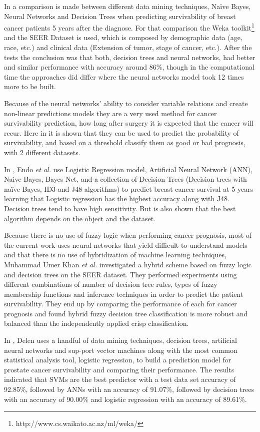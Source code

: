 In \cite{Bellaachia2006} a comparison is made between different data mining techniques, Naïve Bayes, Neural Networks and Decision Trees 
when predicting survivability of breast cancer patients 5 years after the diagnose. For that comparison the Weka toolkit\footnote{http://www.cs.waikato.ac.nz/ml/weka/} and the SEER 
Dataset is used, which is composed by demographic data (age, race, etc.) and clinical data (Extension of tumor, stage of cancer, etc.). 
After the tests the conclusion was that both, decision trees and neural networks, had better and similar performance with accuracy around 86\%, 
though in the computational time the approaches did differ where the neural networks model took 12 times more to be built.

Because of the neural networks’ ability to consider variable relations and create non-linear predictions models they are a very used 
method for cancer survivability prediction, how long after surgery it is expected that the cancer will recur. Here in \cite{Chi2007} it 
is shown that they can be used to predict the probability of survivability, and based on a threshold classify them as good or bad prognosis,
 with 2 different datasets. 

 In \cite{Endo2008}, Endo \emph{et al.} use Logistic Regression model, Artificial Neural Network (ANN), Naive Bayes, Bayes Net, and a collection of Decision Trees (Decision trees with naïve Bayes, ID3 and J48 algorithms) to predict breast cancer survival at 5 years learning that Logistic regression has the 
 highest accuracy along with J48. Decision trees tend to have high sensitivity. But is also shown that the best algorithm depends on the object
 and the dataset.

Because there is no use of fuzzy logic when performing cancer prognosis, most of the current work uses neural networks that yield difficult
 to understand models and that there is no use of hybridization of machine learning techniques, Muhammad Umer Khan \emph{et al.} investigated a hybrid
 scheme based on fuzzy logic and decision trees on the SEER dataset. They performed experiments using different combinations of number of 
 decision tree rules, types of fuzzy membership functions and inference techniques in order to predict the patient survivability. They end up
 by comparing the performance of each for cancer prognosis and found hybrid fuzzy decision tree classification is more robust and balanced
 than the independently applied crisp classification. \cite{Khan2008}

In \cite{Delen2009}, Delen uses a handful of data mining techniques, decision trees, artificial neural networks and sup-port vector machines
 along with the most common statistical analysis tool, logistic regression, to build a prediction model for prostate cancer survivability and 
 comparing their performance. The results indicated that SVMs are the best predictor with a test data set accuracy of 92.85\%, followed by ANNs 
 with an accuracy of 91.07\%, followed by decision trees with an accuracy of 90.00\% and logistic regression with an accuracy of 89.61\%.

